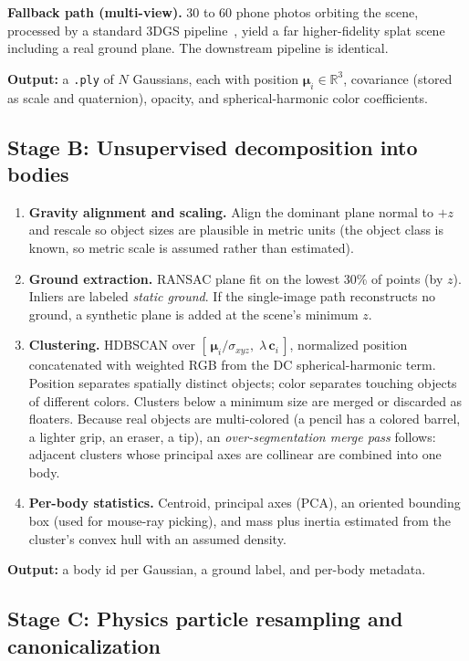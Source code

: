 \documentclass[11pt]{article}
\begin{document}
\textbf{Fallback path (multi-view).} 30 to 60 phone photos orbiting the scene, processed by a standard 3DGS pipeline~\cite{3dgs}, yield a far higher-fidelity splat scene including a real ground plane. The downstream pipeline is identical.

\textbf{Output:} a \texttt{.ply} of $N$ Gaussians, each with position $\boldsymbol{\mu}_i \in \mathbb{R}^3$, covariance (stored as scale and quaternion), opacity, and spherical-harmonic color coefficients.

\subsection{Stage B: Unsupervised decomposition into bodies}
\label{sec:stageB}

\begin{enumerate}[itemsep=2pt]
  \item \textbf{Gravity alignment and scaling.} Align the dominant plane normal to $+z$ and rescale so object sizes are plausible in metric units (the object class is known, so metric scale is assumed rather than estimated).
  \item \textbf{Ground extraction.} RANSAC plane fit on the lowest 30\% of points (by $z$). Inliers are labeled \emph{static ground}. If the single-image path reconstructs no ground, a synthetic plane is added at the scene's minimum $z$.
  \item \textbf{Clustering.} HDBSCAN over $[\,\boldsymbol{\mu}_i / \sigma_{xyz},\; \lambda\,\mathbf{c}_i\,]$, normalized position concatenated with weighted RGB from the DC spherical-harmonic term. Position separates spatially distinct objects; color separates touching objects of different colors. Clusters below a minimum size are merged or discarded as floaters. Because real objects are multi-colored (a pencil has a colored barrel, a lighter grip, an eraser, a tip), an \emph{over-segmentation merge pass} follows: adjacent clusters whose principal axes are collinear are combined into one body.
  \item \textbf{Per-body statistics.} Centroid, principal axes (PCA), an oriented bounding box (used for mouse-ray picking), and mass plus inertia estimated from the cluster's convex hull with an assumed density.
\end{enumerate}

\textbf{Output:} a body id per Gaussian, a ground label, and per-body metadata.

\subsection{Stage C: Physics particle resampling and canonicalization}
\label{sec:stageC}
\end{document}
